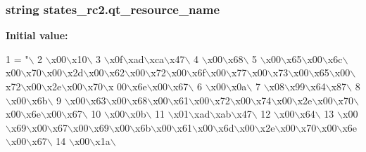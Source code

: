 \subsubsection[{qt\+\_\+resource\+\_\+name}]{\setlength{\rightskip}{0pt plus 5cm}string states\+\_\+rc2.\+qt\+\_\+resource\+\_\+name}\label{namespacestates__rc2_a75d8bc6a510756dba40bd0db7b4b111c}
{\bfseries Initial value\+:}
\begin{DoxyCode}
1 = \textcolor{stringliteral}{"\(\backslash\)}
2 \textcolor{stringliteral}{\(\backslash\)x00\(\backslash\)x10\(\backslash\)}
3 \textcolor{stringliteral}{\(\backslash\)x0f\(\backslash\)xad\(\backslash\)xca\(\backslash\)x47\(\backslash\)}
4 \textcolor{stringliteral}{\(\backslash\)x00\(\backslash\)x68\(\backslash\)}
5 \textcolor{stringliteral}{\(\backslash\)x00\(\backslash\)x65\(\backslash\)x00\(\backslash\)x6c\(\backslash\)x00\(\backslash\)x70\(\backslash\)x00\(\backslash\)x2d\(\backslash\)x00\(\backslash\)x62\(\backslash\)x00\(\backslash\)x72\(\backslash\)x00\(\backslash\)x6f\(\backslash\)x00\(\backslash\)x77\(\backslash\)x00\(\backslash\)x73\(\backslash\)x00\(\backslash\)x65\(\backslash\)x00\(\backslash\)x72\(\backslash\)x00\(\backslash\)x2e\(\backslash\)x00\(\backslash\)x70\(\backslash\)x
      00\(\backslash\)x6e\(\backslash\)x00\(\backslash\)x67\(\backslash\)}
6 \textcolor{stringliteral}{\(\backslash\)x00\(\backslash\)x0a\(\backslash\)}
7 \textcolor{stringliteral}{\(\backslash\)x08\(\backslash\)x99\(\backslash\)x64\(\backslash\)x87\(\backslash\)}
8 \textcolor{stringliteral}{\(\backslash\)x00\(\backslash\)x6b\(\backslash\)}
9 \textcolor{stringliteral}{\(\backslash\)x00\(\backslash\)x63\(\backslash\)x00\(\backslash\)x68\(\backslash\)x00\(\backslash\)x61\(\backslash\)x00\(\backslash\)x72\(\backslash\)x00\(\backslash\)x74\(\backslash\)x00\(\backslash\)x2e\(\backslash\)x00\(\backslash\)x70\(\backslash\)x00\(\backslash\)x6e\(\backslash\)x00\(\backslash\)x67\(\backslash\)}
10 \textcolor{stringliteral}{\(\backslash\)x00\(\backslash\)x0b\(\backslash\)}
11 \textcolor{stringliteral}{\(\backslash\)x01\(\backslash\)xad\(\backslash\)xab\(\backslash\)x47\(\backslash\)}
12 \textcolor{stringliteral}{\(\backslash\)x00\(\backslash\)x64\(\backslash\)}
13 \textcolor{stringliteral}{\(\backslash\)x00\(\backslash\)x69\(\backslash\)x00\(\backslash\)x67\(\backslash\)x00\(\backslash\)x69\(\backslash\)x00\(\backslash\)x6b\(\backslash\)x00\(\backslash\)x61\(\backslash\)x00\(\backslash\)x6d\(\backslash\)x00\(\backslash\)x2e\(\backslash\)x00\(\backslash\)x70\(\backslash\)x00\(\backslash\)x6e\(\backslash\)x00\(\backslash\)x67\(\backslash\)}
14 \textcolor{stringliteral}{\(\backslash\)x00\(\backslash\)x1a\(\backslash\)}

\end{DoxyCode}
